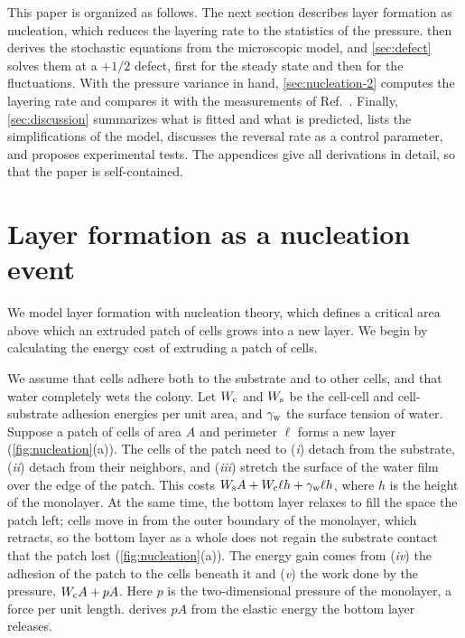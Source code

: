 \documentclass[aps,pre,reprint,superscriptaddress,longbibliography,nofootinbib
]{revtex4-2}
\begin{document}
This paper is organized as follows. The next section
describes layer formation as nucleation, which reduces the
layering rate to the statistics of the pressure.
 then derives the stochastic equations from
the microscopic model, and \cref{sec:defect} solves them at
a $+1/2$ defect, first for the steady state and then for
the fluctuations. With the pressure variance in hand,
\cref{sec:nucleation-2} computes the layering rate and
compares it with the measurements of
Ref.~\cite{copenhagen2021}. Finally, \cref{sec:discussion}
summarizes what is fitted and what is predicted, lists the
simplifications of the model, discusses the reversal rate
as a control parameter, and proposes experimental tests.
The appendices give all derivations in detail, so that the
paper is self-contained.

\section{Layer formation as a nucleation event}
\label{sec:nucleation-1}


We model layer formation with nucleation theory, which
defines a critical area above which an extruded patch of
cells grows into a new layer. We begin by calculating the
energy cost of extruding a patch of cells.


We assume that cells adhere both to the substrate and to
other cells, and that water completely wets the colony. Let
$W_{\rm c}$ and $W_{\rm s}$ be the cell-cell and cell-substrate
adhesion energies per unit area, and $\gamma_{\rm w}$ the surface
tension of water. Suppose a patch of cells of area $A$ and
perimeter $\ell$ forms a new layer
(\cref{fig:nucleation}(a)). The cells of the patch need to
(\textit{i}) detach from the substrate, (\textit{ii})
detach from their neighbors, and (\textit{iii}) stretch the
surface of the water film over the edge of the patch. This
costs $W_{\rm s} A + W_{\rm c}\ell h + \gamma_{\rm w}\ell h$, where $h$ is the
height of the monolayer. At the same time, the bottom layer
relaxes to fill the space the patch left; cells move in
from the outer boundary of the monolayer, which retracts,
so the bottom layer as a whole does not regain the
substrate contact that the patch lost
(\cref{fig:nucleation}(a)). The energy gain comes from
(\textit{iv}) the adhesion of the patch to the cells
beneath it and (\textit{v}) the work done by the pressure,
$W_{\rm c} A + pA$. Here $p$ is the two-dimensional pressure of
the monolayer, a force per unit length.
 derives $pA$ from the elastic energy
the bottom layer releases.
\end{document}
